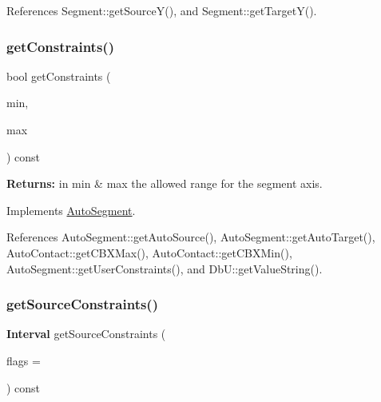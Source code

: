 References Segment\+::get\+Source\+Y(), and Segment\+::get\+Target\+Y().

\mbox{\label{classKatabatic_1_1AutoVertical_a16737e7f2b77f8595fd2b607fac0f2f5}} 
\subsubsection{\texorpdfstring{get\+Constraints()}{getConstraints()}}
{\footnotesize\ttfamily bool get\+Constraints (\begin{DoxyParamCaption}\item[{\textbf{ Db\+U\+::\+Unit} \&}]{min,  }\item[{\textbf{ Db\+U\+::\+Unit} \&}]{max }\end{DoxyParamCaption}) const\hspace{0.3cm}{\ttfamily [virtual]}}

{\bfseries Returns\+:} in {\ttfamily min} \& {\ttfamily max} the allowed range for the segment axis. 

Implements \mbox{\hyperlink{classKatabatic_1_1AutoSegment_a7c2fed22b081f8d3b7a69abb457153ea}{Auto\+Segment}}.



References Auto\+Segment\+::get\+Auto\+Source(), Auto\+Segment\+::get\+Auto\+Target(), Auto\+Contact\+::get\+C\+B\+X\+Max(), Auto\+Contact\+::get\+C\+B\+X\+Min(), Auto\+Segment\+::get\+User\+Constraints(), and Db\+U\+::get\+Value\+String().

\mbox{\label{classKatabatic_1_1AutoVertical_a3239751f475bc65adb9d56f6c771ebb0}} 
\subsubsection{\texorpdfstring{get\+Source\+Constraints()}{getSourceConstraints()}}
{\footnotesize\ttfamily \textbf{ Interval} get\+Source\+Constraints (\begin{DoxyParamCaption}\item[{unsigned int}]{flags = {} }\end{DoxyParamCaption}) const\hspace{0.3cm}{\ttfamily [virtual]}}

